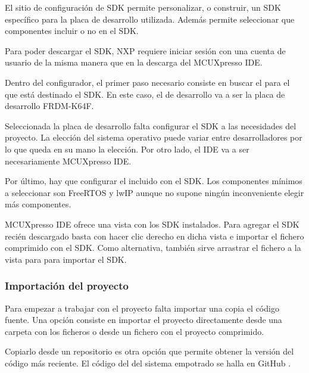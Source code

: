 El sitio de configuración de SDK permite personalizar, o construir, un SDK
específico para la placa de desarrollo utilizada. Además permite seleccionar
que componentes incluir o no en el SDK.

Para poder descargar el SDK, NXP requiere iniciar sesión con una cuenta de
usuario de la misma manera que en la descarga del MCUXpresso IDE.

Dentro del configurador, el primer paso necesario consiste en buscar el
\hw{} para el que está destinado el SDK. En este caso, el \hw{} de desarrollo
va a ser la placa de desarrollo FRDM-K64F.


Seleccionada la placa de desarrollo falta configurar el SDK a las necesidades
del proyecto. La elección del sistema operativo puede variar entre
desarrolladores por lo que queda en su mano la elección. Por otro lado, el IDE
va a ser necesariamente MCUXpresso IDE.

Por último, hay que configurar el  incluido con el SDK.
Los componentes mínimos a seleccionar son FreeRTOS y lwIP aunque no supone
ningún inconveniente elegir más componentes.


MCUXpresso IDE ofrece una vista con los SDK instalados. Para agregar el SDK
recién descargado basta con hacer clic derecho en dicha vista e importar el
fichero comprimido con el SDK. Como alternativa, también sirve arrastrar el
fichero a la vista para para importar el SDK.



\subsubsection{Importación del proyecto} \label{sec:importacion-proj}
Para empezar a trabajar con el proyecto falta importar una copia el código
fuente. Una opción consiste en importar el proyecto directamente desde una
carpeta con los ficheros o desde un fichero con el proyecto comprimido.

Copiarlo desde un repositorio es otra opción que permite obtener la versión
del código más reciente. El código del \sw{} del sistema empotrado se halla en
GitHub \cite{webpage:repo-se}.

